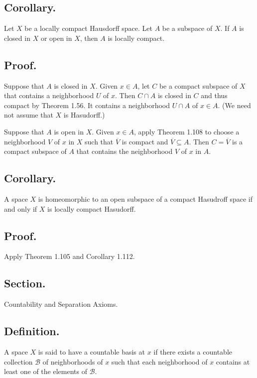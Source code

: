 \documentclass[titlepage]{article}
\begin{document}
\subsection{Corollary.} Let $X$ be a locally compact Hausdorff space. Let $A$ be a subspace of $X$. If $A$ is closed in $X$ or open in $X$, then $A$ is locally compact.

\subsection{Proof.} Suppose that $A$ is closed in $X$. Given $x \in A$, let $C$ be a compact subspace of $X$ that contains a neighborhood $U$ of $x$. Then $C \cap A$ is closed in $C$ and thus compact by Theorem 1.56. It contains a neighborhood $U \cap A$ of $x \in A$. (We need not assume that $X$ is Hasudorff.)

Suppose that $A$ is open in $X$. Given $x \in A$, apply Theorem 1.108 to choose a neighborhood $V$ of $x$ in $X$ such that $\overline{V}$ is compact and $\overline{V} \subseteq A$. Then $C = \overline{V}$ is a compact subspace of $A$ that contains the neighborhood $V$ of $x$ in $A$.

\subsection{Corollary.} A space $X$ is homeomorphic to an open subspace of a compact Hasudroff space if and only if $X$ is locally compact Hasudorff.

\subsection{Proof.} Apply Theorem 1.105 and Corollary 1.112.

\newpage {}

\subsection{Section.} Countability and Separation Axioms.

\subsection{Definition.} A space $X$ is said to have a countable basis at $x$ if there exists a countable collection $\mathcal{B}$ of neighborhoods of $x$ such that each neighborhood of $x$ contains at least one of the elements of $\mathcal{B}$.
\end{document}
